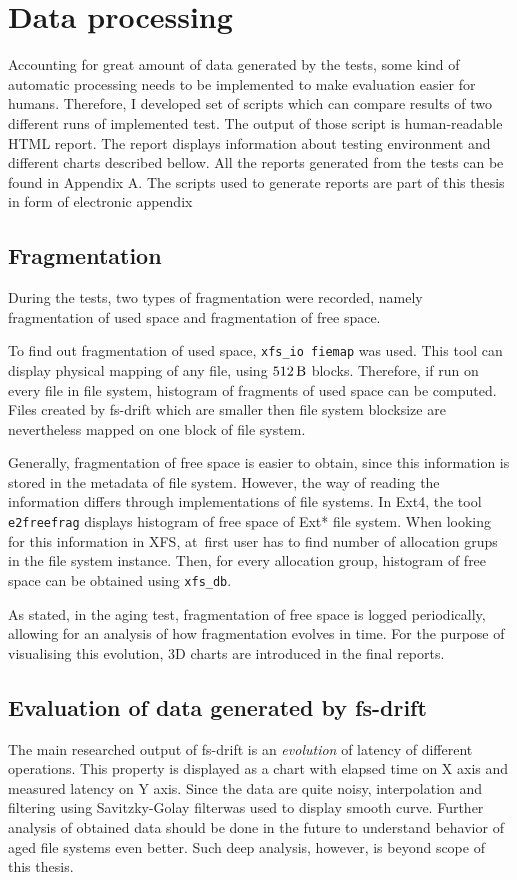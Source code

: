 \documentclass[
  color, %
  table, %
  lof,   %
  lot,   %
]{fithesis3}
\begin{document}
\section{Data processing}
Accounting for great amount of data generated by the tests, some kind of automatic processing needs to be implemented to make evaluation easier for humans. Therefore, I developed set of scripts which can compare results of two different runs of implemented test. The output of those script is human-readable HTML report. The report displays information about testing environment and different charts described bellow. All the reports generated from the tests can be found in Appendix A. The scripts used to generate reports are part of this thesis in form of electronic appendix

\subsection{Fragmentation}
During the tests, two types of fragmentation were recorded, namely fragmentation of used space and fragmentation of free space.

To find out fragmentation of used space, \texttt{xfs\_io fiemap} was used. This tool can display physical mapping of any file, using $\SI{512}{\byte}$ blocks. Therefore, if run on every file in file system, histogram of fragments of used space can be computed. Files created by fs-drift which are smaller then file system blocksize are nevertheless mapped on one block of file system.

Generally, fragmentation of free space is easier to obtain, since this information is stored in the metadata of file system. However, the way of reading the information differs through implementations of file systems. In Ext4, the tool \texttt{e2freefrag} displays histogram of free space of Ext* file system. When looking for this information in XFS, at~first user has to find number of allocation grups in the file system instance. Then, for every allocation group, histogram of free space can be obtained using \texttt{xfs\_db}.

As stated, in the aging test, fragmentation of free space is logged periodically, allowing for an analysis of how fragmentation evolves in time. For the purpose of visualising this evolution, 3D charts are introduced in the final reports.

\subsection{Evaluation of data generated by fs-drift}
The main researched output of fs-drift is an \emph{evolution} of latency of different operations. This property is displayed as a chart with elapsed time on X axis and measured latency on Y axis. Since the data are quite noisy, interpolation and filtering using Savitzky-Golay filter\footnotemark[1] was used to display smooth curve. Further analysis of obtained data should be done in the future to understand behavior of aged file systems even better. Such deep analysis, however, is beyond scope of this thesis.
\end{document}
